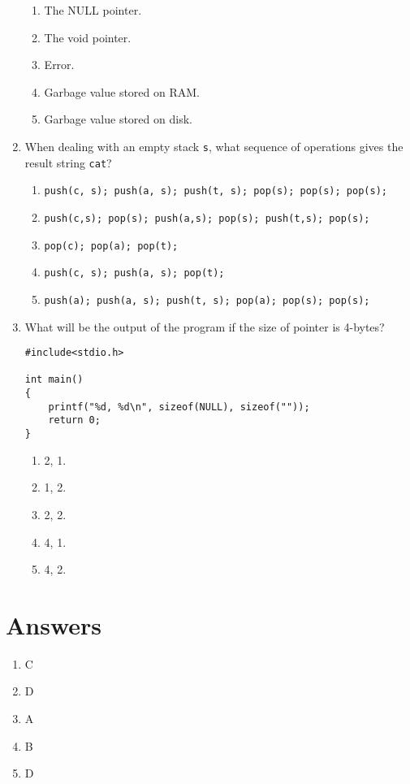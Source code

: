 \documentclass{article}
\begin{document}
\begin{enumerate}
            \begin{enumerate}
                \item The NULL pointer.
                \item The void pointer.
                \item Error.
                \item Garbage value stored on RAM.
                \item Garbage value stored on disk.
            \end{enumerate}
\item When dealing with an empty stack \texttt{s}, what sequence of operations gives the result string \texttt{cat}?
            
            \begin{enumerate}
                \item \texttt{push(c, s); push(a, s); push(t, s); pop(s); pop(s); pop(s);}
                \item \texttt{push(c,s); pop(s); push(a,s); pop(s); push(t,s); pop(s);}
                \item \texttt{pop(c); pop(a); pop(t);}
                \item \texttt{push(c, s); push(a, s); pop(t);}
                \item \texttt{push(a); push(a, s); push(t, s); pop(a); pop(s); pop(s);}
            \end{enumerate}
\item What will be the output of the program if the size of pointer is 4-bytes?

            \begin{verbatim}
#include<stdio.h>

int main()
{
    printf("%d, %d\n", sizeof(NULL), sizeof(""));
    return 0;
}
            \end{verbatim}
    
            \begin{enumerate}
                \item 2, 1.
                \item 1, 2.
                \item 2, 2.
                \item 4, 1.
                \item 4, 2.
            \end{enumerate}
\end{enumerate}
\section{Answers}
\begin{enumerate}
\item C
\item D
\item A
\item B
\item D
\end{enumerate}
\end{document}
